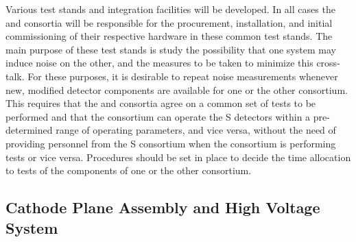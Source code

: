 Various test stands and integration facilities will be developed. In all cases the  and  consortia will be responsible for the procurement, installation, and initial commissioning of their respective hardware in these common test stands. The main purpose of these test stands is study the possibility that one system may induce noise on the other, and the measures to be taken to minimize this cross-talk. For these purposes, it is desirable to repeat noise measurements whenever new, modified detector components are available for one or the other consortium. This requires that the  and  consortia agree on a common set of tests to be performed and that the  consortium can operate the S detectors within a pre-determined range of operating parameters, and vice versa, without the need of providing personnel from the S consortium when the  consortium is performing tests or vice versa. Procedures should be set in place to decide the time allocation to tests of the components of one or the other consortium.


\subsection{Cathode Plane Assembly and High Voltage System}
\label{sec:fdsp-pd-intfc-le}


